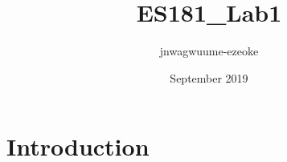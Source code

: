 \documentclass{article}
\title{ES181_Lab1}
\author{jnwagwuume-ezeoke }
\date{September 2019}
\begin{document}
\maketitle

\section{Introduction}
\end{document}
